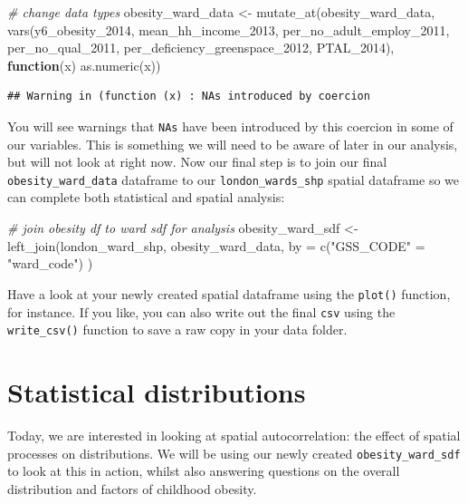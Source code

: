 \documentclass[
]{book}
\newenvironment{Shaded}{\begin{snugshade}}{\end{snugshade}}
\newcommand{\AttributeTok}[1]{\textcolor[rgb]{0.77,0.63,0.00}{#1}}
\newcommand{\CommentTok}[1]{\textcolor[rgb]{0.56,0.35,0.01}{\textit{#1}}}
\newcommand{\ControlFlowTok}[1]{\textcolor[rgb]{0.13,0.29,0.53}{\textbf{#1}}}
\newcommand{\FunctionTok}[1]{\textcolor[rgb]{0.00,0.00,0.00}{#1}}
\newcommand{\NormalTok}[1]{#1}
\newcommand{\OtherTok}[1]{\textcolor[rgb]{0.56,0.35,0.01}{#1}}
\newcommand{\StringTok}[1]{\textcolor[rgb]{0.31,0.60,0.02}{#1}}
\begin{document}
\begin{Shaded}
\begin{Highlighting}[]
\CommentTok{\# change data types}
\NormalTok{obesity\_ward\_data }\OtherTok{\textless{}{-}} \FunctionTok{mutate\_at}\NormalTok{(obesity\_ward\_data, }\FunctionTok{vars}\NormalTok{(y6\_obesity\_2014, mean\_hh\_income\_2013,}
\NormalTok{    per\_no\_adult\_employ\_2011, per\_no\_qual\_2011, per\_deficiency\_greenspace\_2012,}
\NormalTok{    PTAL\_2014), }\ControlFlowTok{function}\NormalTok{(x) }\FunctionTok{as.numeric}\NormalTok{(x))}
\end{Highlighting}
\end{Shaded}

\begin{verbatim}
## Warning in (function (x) : NAs introduced by coercion
\end{verbatim}

You will see warnings that \texttt{NAs} have been introduced by this coercion in some of our variables. This is something we will need to be aware of later in our analysis, but will not look at right now. Now our final step is to join our final \texttt{obesity\_ward\_data} dataframe to our \texttt{london\_wards\_shp} spatial dataframe so we can complete both statistical and spatial analysis:

\begin{Shaded}
\begin{Highlighting}[]
\CommentTok{\# join obesity df to ward sdf for analysis}
\NormalTok{obesity\_ward\_sdf }\OtherTok{\textless{}{-}} \FunctionTok{left\_join}\NormalTok{(london\_ward\_shp, obesity\_ward\_data,}
  \AttributeTok{by =} \FunctionTok{c}\NormalTok{(}\StringTok{"GSS\_CODE"} \OtherTok{=} \StringTok{"ward\_code"}\NormalTok{)}
\NormalTok{)}
\end{Highlighting}
\end{Shaded}

Have a look at your newly created spatial dataframe using the \texttt{plot()} function, for instance. If you like, you can also write out the final \texttt{csv} using the \texttt{write\_csv()} function to save a raw copy in your data folder.

\hypertarget{statistical-distributions}{%
\section{Statistical distributions}\label{statistical-distributions}}

Today, we are interested in looking at spatial autocorrelation: the effect of spatial processes on distributions. We will be using our newly created \texttt{obesity\_ward\_sdf} to look at this in action, whilst also answering questions on the overall distribution and factors of childhood obesity.
\end{document}
